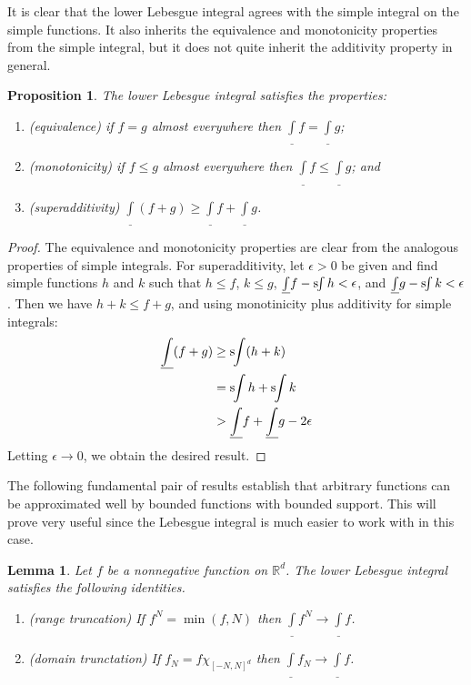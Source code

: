 \documentclass[11pt,oneside]{amsbook}
\newcommand{\RR}{{\mathbb R}}
\newcommand{\sint}{\text{s}\kern-3pt\int}
\newcommand{\lint}{\underline\int}
\theoremstyle{definition}
\theoremstyle{plain}
\newtheorem{lem}[thm]{Lemma}
\newtheorem{prop}[thm]{Proposition}
\theoremstyle{definition}
\theoremstyle{remark}
\numberwithin{equation}{section}
\numberwithin{figure}{section}
\begin{document}
It is clear that the lower Lebesgue integral agrees with the simple integral on the simple functions. It also inherits the equivalence and monotonicity properties from the simple integral, but it does not quite inherit the additivity property in general.

\begin{prop}
  The lower Lebesgue integral satisfies the properties:
  \begin{enumerate}
  \item (equivalence) if $f=g$ almost everywhere then $\lint f=\lint g$;
  \item (monotonicity) if $f\leq g$ almost everywhere then $\lint f\leq\lint g$; and
  \item (superadditivity) $\lint(f+g)\geq\lint f+\lint g$.
  \end{enumerate}
\end{prop}

\begin{proof}
  The equivalence and monotonicity properties are clear from the analogous properties of simple integrals. For superadditivity, let $\epsilon>0$ be given and find simple functions $h$ and $k$ such that $h\leq f$, $k\leq g$, $\lint f-\sint h<\epsilon$, and $\lint g-\sint k<\epsilon$. Then we have $h+k\leq f+g$, and using monotinicity plus additivity for simple integrals:
  \begin{align*}
    \lint(f+g)&\geq\sint(h+k)\\
              &=\sint h+\sint k\\
              &>\lint f+\lint g-2\epsilon
  \end{align*}
  Letting $\epsilon\to0$, we obtain the desired result.
\end{proof}

The following fundamental pair of results establish that arbitrary functions can be approximated well by bounded functions with bounded support. This will prove very useful since the Lebesgue integral is much easier to work with in this case.

\begin{lem}
  Let $f$ be a nonnegative function on $\RR^d$. The lower Lebesgue integral satisfies the following identities.
  \begin{enumerate}
  \item (range truncation) If $f^N=\min(f,N)$ then $\lint f^N\to\lint f$.
  \item (domain trunctation) If $f_N=f\chi_{[-N,N]^d}$ then $\lint f_N\to\lint f$.
  \end{enumerate}
\end{lem}
\end{document}
